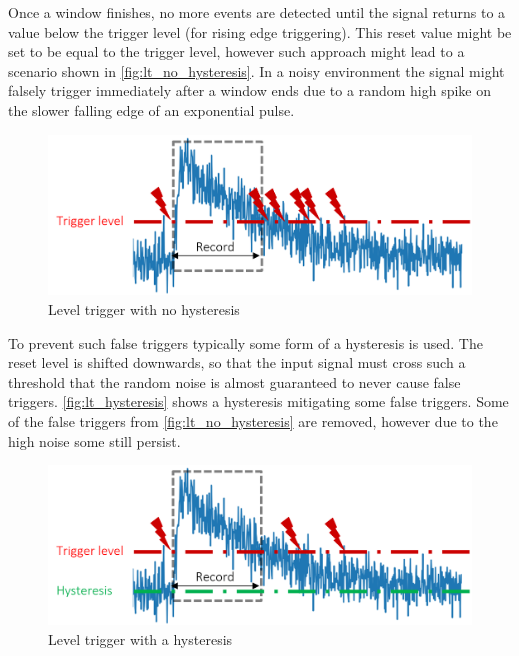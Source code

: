 Once a window finishes, no more events are detected
until the signal returns to a value below the trigger level
(for rising edge triggering). This reset value might be 
set to be equal to the trigger level, however such approach
might lead to a scenario shown in \autoref{fig:lt_no_hysteresis}.
In a noisy environment the signal might falsely trigger immediately after
a window ends due to a random high spike on the slower falling edge of
an exponential pulse.
\begin{figure}[H]
  \centering
  \includegraphics[width=.7\linewidth]{media/lt_no_hysteresis.png}
  \caption{Level trigger with no hysteresis}
  \label{fig:lt_no_hysteresis}
\end{figure}

To prevent such false triggers typically some form of a hysteresis is used.
The reset level is shifted downwards, so that the input signal must cross
such a threshold that the random noise is almost guaranteed to never cause false 
triggers. \autoref{fig:lt_hysteresis} shows a hysteresis mitigating some false triggers.
Some of the false triggers from \autoref{fig:lt_no_hysteresis} are removed, however 
due to the high noise some still persist.
\begin{figure}[H]
  \centering
  \includegraphics[width=.7\linewidth]{media/lt_hysteresis.png}
  \caption{Level trigger with a hysteresis}
  \label{fig:lt_hysteresis} 
\end{figure}

